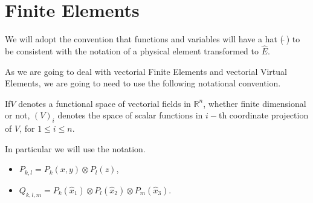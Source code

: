 \chapter{Finite Elements}\label{aux_label43}
We will adopt the convention that functions and variables 
will have a hat ($\,\hat{}\,$) to be consistent with the notation
of a physical element transformed to $\hat E$.

As we are going to deal with vectorial Finite Elements and
vectorial Virtual Elements, we are going to need to use the following notational convention.
\begin{defi} If\hspace{7pt}$V$ denotes a functional space of vectorial
fields in $\mathbb{R}^n$, whether finite dimensional
or not, $(V)_i$ denotes the space of scalar functions in $i-$th
coordinate projection
of $V$, for $1\leqslant i\leqslant n$.
\end{defi}
In particular we will use the notation.
\begin{notation}
  \begin{itemize}
    \item $P_{k,l} 		= P_{k}(x,y) 	 \otimes P_{l}(z)$,
    \item $Q_{k,l,m} 	= P_k(\hat{x}_1) \otimes P_l(\hat{x}_2)\otimes P_m(\hat{x}_3)$.
  \end{itemize}
\end{notation}



